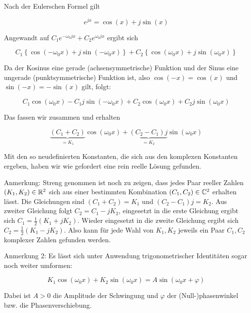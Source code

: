 \item Nach der Eulerschen Formel gilt

$$
	e^{jx} = \cos(x) + j \sin(x)
$$

Angewandt auf $C_1e^{-\omega_0 j x} + C_2e^{\omega_0 j x}$ ergibt sich

$$
	C_1 \left\lbrace \cos(-\omega_0 x) + j \sin(-\omega_0 x) \right\rbrace + C_2 \left\lbrace \cos(\omega_0 x) + j \sin(\omega_0 x) \right\rbrace
$$

Da der Kosinus eine gerade (achsensymmetrische) Funktion und der Sinus eine ungerade (punktsymmetrische) Funktion ist, also $\cos(-x) = \cos(x)$ und $\sin(-x) = -\sin(x)$ gilt, folgt:

$$
	C_1 \cos(\omega_0 x) - C_1 j \sin(-\omega_0 x) + C_2 \cos(\omega_0 x) + C_2 j \sin(\omega_0 x)
$$

Das fassen wir zusammen und erhalten

$$
	\underbrace{(C_1 + C_2)}_{=K_1} \cos(\omega_0 x) + \underbrace{(C_2-C_1) j}_{=K_2} \sin(\omega_0 x)
$$

Mit den so neudefinierten Konstanten, die sich aus den komplexen Konstanten ergeben, haben wir wie gefordert eine rein reelle Lösung gefunden.

Anmerkung: Streng genommen ist noch zu zeigen, dass jedes Paar reeller Zahlen $(K_1,K_2)\in\mathbb{R}^2$ sich aus einer bestimmten Kombination $(C_1,C_2)\in\mathbb{C}^2$ erhalten lässt. Die Gleichungen sind $(C_1 + C_2) = K_1$ und $(C_2-C_1) j = K_2$. Aus zweiter Gleichung folgt $C_2 = C_1-jK_2$, eingesetzt in die erste Gleichung ergibt sich $C_1 = \frac{1}{2}(K_1+jK_2)$. Wieder eingesetzt in die zweite Gleichung ergibt sich $C_2 = \frac{1}{2}(K_1-jK_2)$. Also kann für jede Wahl von $K_1,K_2$ jeweils ein Paar $C_1, C_2$ komplexer Zahlen gefunden werden.

Anmerkung 2: Es lässt sich unter Anwendung trigonometrischer Identitäten sogar noch weiter umformen:

$$
	K_1  \cos(\omega_0 x) + K_2  \sin(\omega_0 x) = A \sin(\omega_0 x + \varphi)
$$

Dabei ist $A>0$ die Amplitude der Schwingung und $\varphi$ der (Null-)phasenwinkel bzw. die Phasenverschiebung.